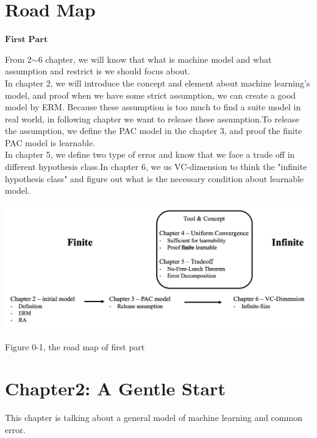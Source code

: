 


\cfoot{\thepage} %

\section*{Road Map}

$\textbf{First Part}$

From 2$\sim$6 chapter, we will know that what is machine model and what assumption and restrict is we should focus about.\\

In chapter 2, we will introduce the concept and element about machine learning's model, and proof when we have some strict assumption, we can create a good model by ERM. Because these assumption is too much to find a suite model in real world, in following chapter we want to release these assumption.To release the assumption, we define the PAC model in the chapter 3, and proof the finite PAC model is learnable.\\

In chapter 5, we define two type of error and know that we face a trade off in different hypothesis class.In chapter 6, we us VC-dimension to think the "infinite hypothesis class" and figure out what is the necessary condition about learnable model.

\begin{center}
	\includegraphics[scale = 0.37]{./figure/0-1.png}
	
	Figure 0-1, the road map of first part
\end{center}


\newpage

\section*{Chapter2: A Gentle Start}
This chapter is talking about a general model of machine learning and common error.


